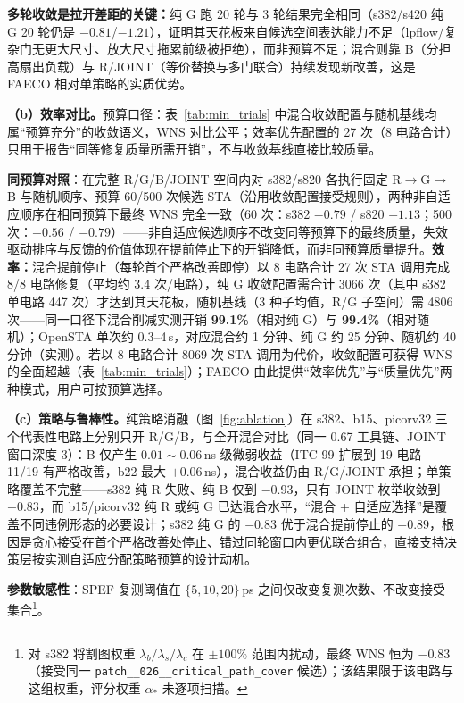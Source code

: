 \documentclass[journal]{IEEEtran}
\begin{document}
\textbf{多轮收敛是拉开差距的关键：}纯 G 跑 20 轮与 3 轮结果完全相同（s382/s420 纯 G 20 轮仍是 $-0.81$/$-1.21$），证明其天花板来自候选空间表达能力不足（lpflow/复杂门无更大尺寸、放大尺寸拖累前级被拒绝），而非预算不足；混合则靠 B（分担高扇出负载）与 R/JOINT（等价替换与多门联合）持续发现新改善，这是 FAECO 相对单策略的实质优势。

\textbf{（b）效率对比。}预算口径：表~\ref{tab:min_trials} 中混合收敛配置与随机基线均属“预算充分”的收敛语义，WNS 对比公平；效率优先配置的 27 次（8 电路合计）只用于报告“同等修复质量所需开销”，不与收敛基线直接比较质量。

\textbf{同预算对照}：在完整 R/G/B/JOINT 空间内对 s382/s820 各执行固定 R$\rightarrow$G$\rightarrow$B 与随机顺序、预算 60/500 次候选 STA（沿用收敛配置接受规则），两种非自适应顺序在相同预算下最终 WNS 完全一致（60 次：s382 $-0.79$ / s820 $-1.13$；500 次：$-0.56$ / $-0.79$）——非自适应候选顺序不改变同等预算下的最终质量，失效驱动排序与反馈的价值体现在提前停止下的开销降低，而非同预算质量提升。\textbf{效率：}混合提前停止（每轮首个严格改善即停）以 8 电路合计 27 次 STA 调用完成 8/8 电路修复（平均约 3.4 次/电路），纯 G 收敛配置需合计 3066 次（其中 s382 单电路 447 次）才达到其天花板，随机基线（3 种子均值，R/G 子空间）需 4806 次——同一口径下混合削减实测开销 \textbf{99.1\%}（相对纯 G）与 \textbf{99.4\%}（相对随机）；OpenSTA 单次约 0.3--4\,s，对应混合约 1 分钟、纯 G 约 25 分钟、随机约 40 分钟（实测）。若以 8 电路合计 8069 次 STA 调用为代价，收敛配置可获得 WNS 的全面超越（表~\ref{tab:min_trials}）；FAECO 由此提供“效率优先”与“质量优先”两种模式，用户可按预算选择。

\textbf{（c）策略与鲁棒性。}纯策略消融（图~\ref{fig:ablation}）在 s382、b15、picorv32 三个代表性电路上分别只开 R/G/B，与全开混合对比（同一 0.67 工具链、JOINT 窗口深度 3）：B 仅产生 $0.01\!\sim\!0.06\,$ns 级微弱收益（ITC-99 扩展到 19 电路 11/19 有严格改善，b22 最大 $+0.06\,$ns），混合收益仍由 R/G/JOINT 承担；单策略覆盖不完整——s382 纯 R 失败、纯 B 仅到 $-0.93$，只有 JOINT 枚举收敛到 $-0.83$，而 b15/picorv32 纯 R 或纯 G 已达混合水平，“混合 + 自适应选择”是覆盖不同违例形态的必要设计；s382 纯 G 的 $-0.83$ 优于混合提前停止的 $-0.89$，根因是贪心接受在首个严格改善处停止、错过同轮窗口内更优联合组合，直接支持决策层按实测自适应分配策略预算的设计动机。

\textbf{参数敏感性}：SPEF 复测阈值在 $\{5,10,20\}\,$ps 之间仅改变复测次数、不改变接受集合\footnote{对 s382 将割图权重 $\lambda_b/\lambda_s/\lambda_c$ 在 $\pm 100\%$ 范围内扰动，最终 WNS 恒为 $-0.83$（接受同一 \texttt{patch\_\_026\_\_critical\_path\_cover} 候选）；该结果限于该电路与这组权重，评分权重 $\alpha_*$ 未逐项扫描。}。
\end{document}
